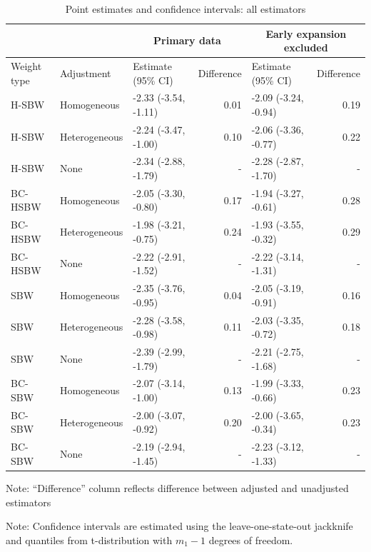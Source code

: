 \begin{table}[h!]
\centering
\begin{threeparttable}
\caption{Point estimates and confidence intervals: all estimators}
\label{tab:confintmain}
\begin{tabular}{lllrlr}
\hline
 &  & \multicolumn{2}{c}{Primary data} & \multicolumn{2}{c}{Early expansion 
 excluded} \\
  \hline
Weight type & Adjustment & Estimate (95\% CI) & Difference & Estimate (95\% CI) & Difference \\ 
  \hline
H-SBW & Homogeneous & -2.33 (-3.54, -1.11) & 0.01 & -2.09 (-3.24, -0.94) & 0.19 \\ 
  H-SBW & Heterogeneous & -2.24 (-3.47, -1.00) & 0.10 & -2.06 (-3.36, -0.77) & 0.22 \\ 
  H-SBW & None & -2.34 (-2.88, -1.79) & - & -2.28 (-2.87, -1.70) & - \\ 
  BC-HSBW & Homogeneous & -2.05 (-3.30, -0.80) & 0.17 & -1.94 (-3.27, -0.61) & 0.28 \\ 
  BC-HSBW & Heterogeneous & -1.98 (-3.21, -0.75) & 0.24 & -1.93 (-3.55, -0.32) & 0.29 \\ 
  BC-HSBW & None & -2.22 (-2.91, -1.52) & - & -2.22 (-3.14, -1.31) & - \\ 
  SBW & Homogeneous & -2.35 (-3.76, -0.95) & 0.04 & -2.05 (-3.19, -0.91) & 0.16 \\ 
  SBW & Heterogeneous & -2.28 (-3.58, -0.98) & 0.11 & -2.03 (-3.35, -0.72) & 0.18 \\ 
  SBW & None & -2.39 (-2.99, -1.79) & - & -2.21 (-2.75, -1.68) & - \\ 
  BC-SBW & Homogeneous & -2.07 (-3.14, -1.00) & 0.13 & -1.99 (-3.33, -0.66) & 0.23 \\ 
  BC-SBW & Heterogeneous & -2.00 (-3.07, -0.92) & 0.20 & -2.00 (-3.65, -0.34) & 0.23 \\ 
  BC-SBW & None & -2.19 (-2.94, -1.45) & - & -2.23 (-3.12, -1.33) & - \\ 
   \hline
\end{tabular}
    \begin{tablenotes}
      \item[] Note: ``Difference'' column reflects difference between adjusted and unadjusted estimators
        \item[] Note: Confidence intervals are estimated using the leave-one-state-out jackknife and quantiles from t-distribution with $m_1 - 1$ degrees of freedom.
    \end{tablenotes}
\end{threeparttable}
\end{table}

